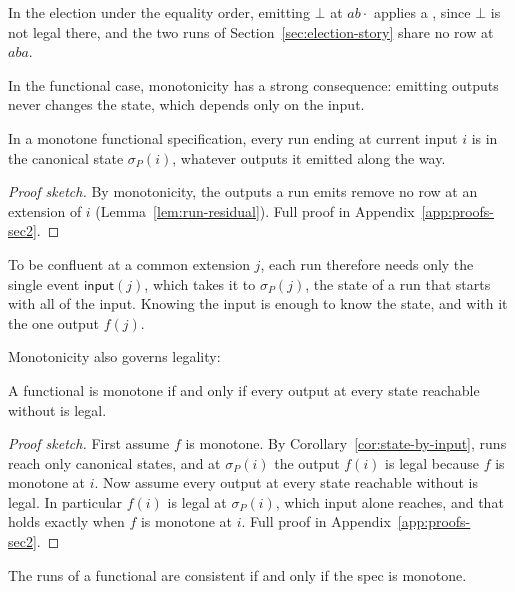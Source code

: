 In the election under the equality order, emitting $\bot$ at $ab\cdot$ applies
a \commitment, since $\bot$ is not legal there, and the two runs of
Section~\ref{sec:election-story} share no row at $aba$.

In the functional case, monotonicity has a strong consequence: emitting outputs
never changes the state, which depends only on the input.

\begin{corollary}
\label{cor:state-by-input}
In a monotone functional specification, every run ending at current
input $i$ is in the canonical state $\sigma_P(i)$, whatever outputs it emitted
along the way.
\end{corollary}

\begin{proof}[Proof sketch]
By monotonicity, the outputs a run emits remove no row at an extension of $i$ (Lemma~\ref{lem:run-residual}).  Full proof in Appendix~\ref{app:proofs-sec2}.
\end{proof}

To be confluent at a common extension $j$, each run therefore needs only the
single event $\mathsf{input}(j)$, which takes it to $\sigma_P(j)$, the state of a
run that starts with all of the input.  Knowing the input is enough to know the state, and with it the one
output $f(j)$.

Monotonicity also governs legality:

\begin{proposition}
\label{prop:functional-exposure-boundary}
A functional \spectype is monotone if and only if every output at
every state reachable without \commitment is legal.
\end{proposition}

\begin{proof}[Proof sketch]
First assume $f$ is monotone.  By Corollary~\ref{cor:state-by-input}, runs
reach only canonical states, and at $\sigma_P(i)$ the output $f(i)$ is legal
because $f$ is monotone at $i$.  Now assume every output at every state
reachable without \commitment is legal.  In particular $f(i)$ is legal at
$\sigma_P(i)$, which input alone reaches, and that holds exactly when $f$ is
monotone at $i$.  Full proof in Appendix~\ref{app:proofs-sec2}.
\end{proof}

\begin{theorem}
\label{thm:functional-calm}
The runs of a functional \spectype are consistent if and only if the spec is
monotone.
\end{theorem}

